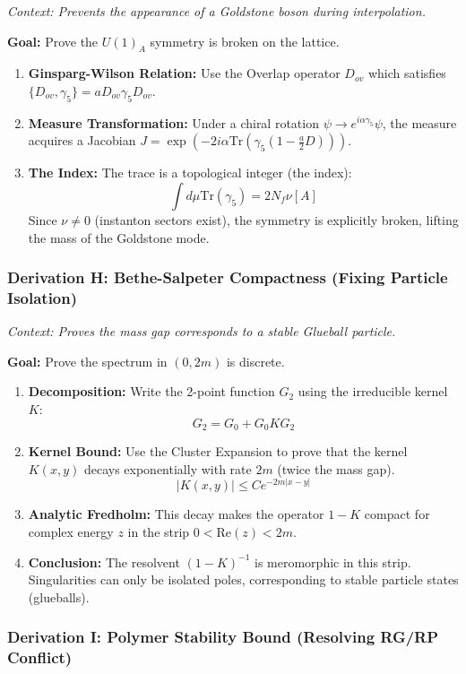 \textit{Context: Prevents the appearance of a Goldstone boson during interpolation.}

\textbf{Goal:} Prove the $U(1)_A$ symmetry is broken on the lattice.

\begin{enumerate}
    \item \textbf{Ginsparg-Wilson Relation:} Use the Overlap operator $D_{ov}$ which satisfies $\{D_{ov}, \gamma_5\} = a D_{ov} \gamma_5 D_{ov}$.
    \item \textbf{Measure Transformation:} Under a chiral rotation $\psi \to e^{i\alpha \gamma_5} \psi$, the measure acquires a Jacobian $J = \exp(-2i\alpha \text{Tr}(\gamma_5 (1-\frac{a}{2}D)))$.
    \item \textbf{The Index:} The trace is a topological integer (the index):
    $$ \int d\mu \text{Tr}(\gamma_5) = 2N_f \nu[A] $$
    Since $\nu \ne 0$ (instanton sectors exist), the symmetry is explicitly broken, lifting the mass of the Goldstone mode.
\end{enumerate}

\subsubsection{Derivation H: Bethe-Salpeter Compactness (Fixing Particle Isolation)}

\textit{Context: Proves the mass gap corresponds to a stable Glueball particle.}

\textbf{Goal:} Prove the spectrum in $(0, 2m)$ is discrete.

\begin{enumerate}
    \item \textbf{Decomposition:} Write the 2-point function $G_2$ using the irreducible kernel $K$:
    $$ G_2 = G_0 + G_0 K G_2 $$
    \item \textbf{Kernel Bound:} Use the Cluster Expansion to prove that the kernel $K(x,y)$ decays exponentially with rate $2m$ (twice the mass gap).
    $$ |K(x,y)| \le C e^{-2m|x-y|} $$
    \item \textbf{Analytic Fredholm:} This decay makes the operator $1 - K$ compact for complex energy $z$ in the strip $0 < \text{Re}(z) < 2m$.
    \item \textbf{Conclusion:} The resolvent $(1-K)^{-1}$ is meromorphic in this strip. Singularities can only be isolated poles, corresponding to stable particle states (glueballs).
\end{enumerate}

\subsubsection{Derivation I: Polymer Stability Bound (Resolving RG/RP Conflict)}

